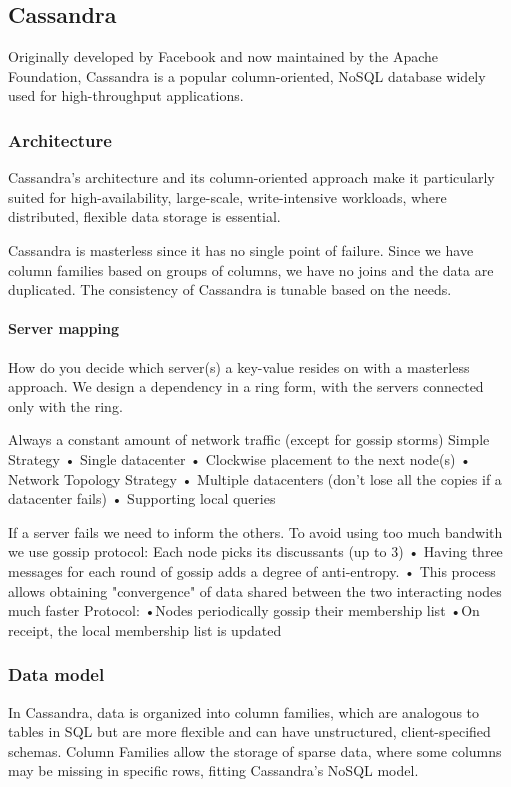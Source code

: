 \subsection{Cassandra}
Originally developed by Facebook and now maintained by the Apache Foundation, Cassandra is a popular column-oriented, NoSQL database widely used for high-throughput applications. 

\subsubsection{Architecture}
Cassandra's architecture and its column-oriented approach make it particularly suited for high-availability, large-scale, write-intensive workloads, where distributed, flexible data storage is essential.

Cassandra is masterless since it has no single point of failure. 
Since we have column families based on groups of columns, we have no joins and the data are duplicated. 
The consistency of Cassandra is tunable based on the needs.

\paragraph*{Server mapping}
How do you decide which server(s) a key-value resides on with a masterless approach. 
We design a dependency in a ring form, with the servers connected only with the ring. 

Always a constant amount of network traffic (except for gossip storms)
Simple Strategy
• Single datacenter
• Clockwise placement to the next node(s)
• Network Topology
Strategy
• Multiple datacenters (don't lose all the copies if a datacenter fails)
• Supporting local queries

If a server fails we need to inform the others. 
To avoid using too much bandwith we use gossip protocol: Each node picks its discussants (up to 3)
• Having three messages for each round of gossip adds a degree of anti-entropy.
• This process allows obtaining "convergence" of data shared between
the two interacting nodes much faster
Protocol:
•Nodes periodically gossip
their membership list
•On receipt, the local
membership list is updated






\subsubsection{Data model}
In Cassandra, data is organized into column families, which are analogous to tables in SQL but are more flexible and can have unstructured, client-specified schemas. 
Column Families allow the storage of sparse data, where some columns may be missing in specific rows, fitting Cassandra's NoSQL model.

